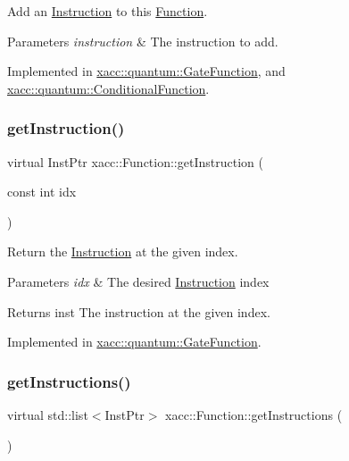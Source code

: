 Add an \hyperlink{a02460}{Instruction} to this \hyperlink{a02456}{Function}.


\begin{DoxyParams}{Parameters}
{\em instruction} & The instruction to add. \\
\hline
\end{DoxyParams}


Implemented in \hyperlink{a01272_a892fb69a10f0a7cb5abdab4cca61b80a}{xacc\+::quantum\+::\+Gate\+Function}, and \hyperlink{a01304_a6aedad20f96390880efdc0a476b3273f}{xacc\+::quantum\+::\+Conditional\+Function}.

\mbox{\label{a02456_afa549fc91b5a05f26d8139954a7e0ed5}} 
\subsubsection{\texorpdfstring{get\+Instruction()}{getInstruction()}}
{\footnotesize\ttfamily virtual Inst\+Ptr xacc\+::\+Function\+::get\+Instruction (\begin{DoxyParamCaption}\item[{const int}]{idx }\end{DoxyParamCaption})\hspace{0.3cm}{\ttfamily [pure virtual]}}

Return the \hyperlink{a02460}{Instruction} at the given index.


\begin{DoxyParams}{Parameters}
{\em idx} & The desired \hyperlink{a02460}{Instruction} index \\
\hline
\end{DoxyParams}
\begin{DoxyReturn}{Returns}
inst The instruction at the given index. 
\end{DoxyReturn}


Implemented in \hyperlink{a01272_a841d656eed8aa9b4c0eec3f1da38069c}{xacc\+::quantum\+::\+Gate\+Function}.

\mbox{\label{a02456_aaf80bd3d49113a92b520785572663032}} 
\subsubsection{\texorpdfstring{get\+Instructions()}{getInstructions()}}
{\footnotesize\ttfamily virtual std\+::list$<$Inst\+Ptr$>$ xacc\+::\+Function\+::get\+Instructions (\begin{DoxyParamCaption}{ }\end{DoxyParamCaption})\hspace{0.3cm}{\ttfamily [pure virtual]}}

